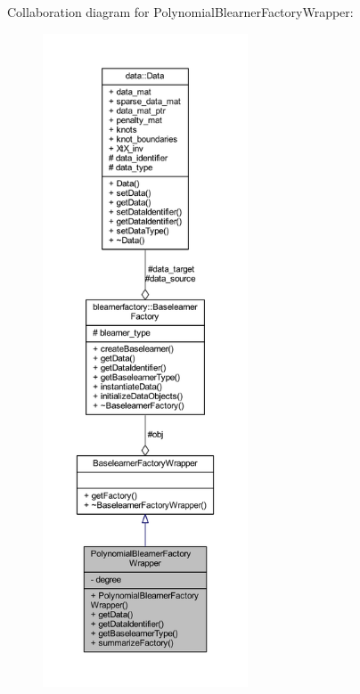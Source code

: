 Collaboration diagram for Polynomial\+Blearner\+Factory\+Wrapper\+:
\nopagebreak
\begin{figure}[H]
\begin{center}
\leavevmode
\includegraphics[height=550pt]{class_polynomial_blearner_factory_wrapper__coll__graph}
\end{center}
\end{figure}
